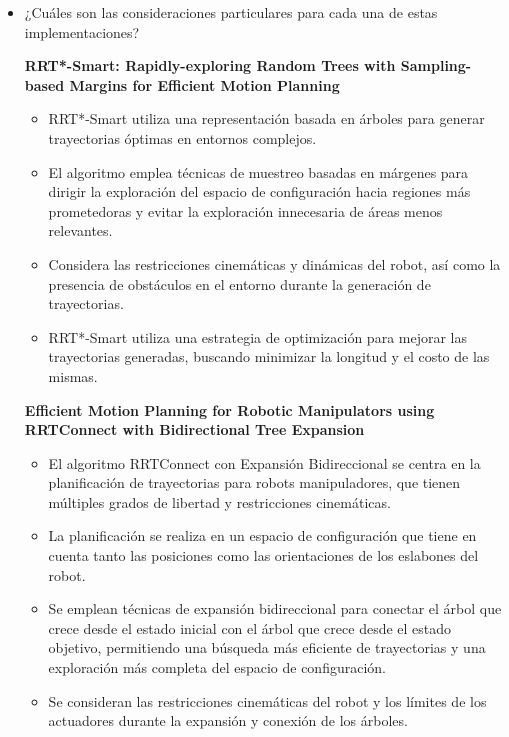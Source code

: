 \documentclass{article}
\begin{document}
\begin{itemize}

\item{¿Cuáles son las consideraciones particulares para cada una de estas implementaciones?} 

  \textbf{RRT*-Smart: Rapidly-exploring Random Trees with Sampling-based Margins for Efficient Motion Planning}\\

  \begin{itemize}
  \item RRT*-Smart utiliza una representación basada en árboles para generar trayectorias óptimas en entornos complejos.
  \item El algoritmo emplea técnicas de muestreo basadas en márgenes para dirigir la exploración del espacio de configuración hacia regiones más prometedoras y evitar la exploración innecesaria de áreas menos relevantes.
  \item Considera las restricciones cinemáticas y dinámicas del robot, así como la presencia de obstáculos en el entorno durante la generación de trayectorias.
  \item RRT*-Smart utiliza una estrategia de optimización para mejorar las trayectorias generadas, buscando minimizar la longitud y el costo de las mismas.
  \end{itemize}
  
  \textbf{Efficient Motion Planning for Robotic Manipulators using RRTConnect with Bidirectional Tree Expansion}\\

  \begin{itemize}
  \item El algoritmo RRTConnect con Expansión Bidireccional se centra en la planificación de trayectorias para robots manipuladores, que tienen múltiples grados de libertad y restricciones cinemáticas.
  \item La planificación se realiza en un espacio de configuración que tiene en cuenta tanto las posiciones como las orientaciones de los eslabones del robot.
  \item Se emplean técnicas de expansión bidireccional para conectar el árbol que crece desde el estado inicial con el árbol que crece desde el estado objetivo, permitiendo una búsqueda más eficiente de trayectorias y una exploración más completa del espacio de configuración.
  \item Se consideran las restricciones cinemáticas del robot y los límites de los actuadores durante la expansión y conexión de los árboles.
  \end{itemize}
  

\end{itemize}
\end{document}

